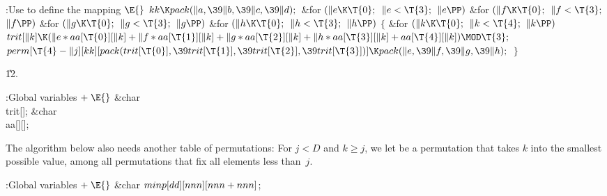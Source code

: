\B{}:Use  to define the mapping \X${}\E{}$\6
$\\{kk}\K\\{pack}(\|a,\39\|b,\39\|c,\39\|d);{}$\6
\&{for} ${}(\|e\K\T{0};{}$ ${}\|e<\T{3};{}$ ${}\|e\PP){}$\1\6
\&{for} ${}(\|f\K\T{0};{}$ ${}\|f<\T{3};{}$ ${}\|f\PP){}$\1\6
\&{for} ${}(\|g\K\T{0};{}$ ${}\|g<\T{3};{}$ ${}\|g\PP){}$\1\6
\&{for} ${}(\|h\K\T{0};{}$ ${}\|h<\T{3};{}$ ${}\|h\PP){}$\5
${}\{{}$\1\6
\&{for} ${}(\|k\K\T{0};{}$ ${}\|k<\T{4};{}$ ${}\|k\PP){}$\1\5
${}\\{trit}[\|k]\K(\|e*\\{aa}[\T{0}][\|k]+\|f*\\{aa}[\T{1}][\|k]+\|g*\\{aa}[%
\T{2}][\|k]+\|h*\\{aa}[\T{3}][\|k]+\\{aa}[\T{4}][\|k])\MOD\T{3};{}$\2\6
${}\\{perm}[\T{4}-\|j][\\{kk}][\\{pack}(\\{trit}[\T{0}],\39\\{trit}[\T{1}],\39%
\\{trit}[\T{2}],\39\\{trit}[\T{3}])]\K\\{pack}(\|e,\39\|f,\39\|g,\39\|h);{}$\6
\4${}\}{}$\2\2\2\2\par
\U12.\fi

\B{}:Global variables\X${}\mathrel+\E{}$\6
\&{char} \\{trit}[];\6
\&{char} \\{aa}[][];\par
\fi

The algorithm below also needs another table of
permutations: For $j<D$ and
$k\ge j$, we let  be a permutation that takes $k$ into
the
smallest possible value, among all permutations that fix all elements
less than~$j$.

\Y\B\4:Global variables\X${}\mathrel+\E{}$\6
\&{char} ${}\\{minp}[\\{dd}][\\{nnn}][\\{nnn}+\\{nnn}]{}$;\par
\fi

